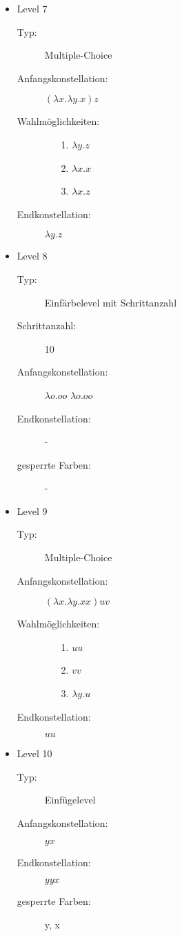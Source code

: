 \begin{itemize}
	\item{Level 7} 
		\begin{description}
			\item[Typ:] Multiple-Choice 
			\item[Anfangskonstellation:] \((\lambda x . \lambda y . x ) z\)    
			\item[Wahlmöglichkeiten:] \hfill
				\begin{itemize}
					\item[1.] \( \lambda y . z\) 
					\item[2.] \( \lambda x . x \) 
					\item[3.] \( \lambda x . z\)
				\end{itemize}
			\item[Endkonstellation:]\( \lambda y . z\)
		\end{description}

	\item{Level 8} 
		\begin{description}
			\item[Typ:] Einfärbelevel mit Schrittanzahl
			\item[Schrittanzahl:] 10
			\item[Anfangskonstellation:] \(\lambda o . o o \)  \(\lambda o . o o \) 
			\item[Endkonstellation:]  -
			\item[gesperrte Farben:] -
		\end{description}

	\item{Level 9} 
		\begin{description}
			\item[Typ:] Multiple-Choice 
			\item[Anfangskonstellation:] \((\lambda x . \lambda y . x x ) u v\)    
			\item[Wahlmöglichkeiten:] \hfill
				\begin{itemize}
					\item[1.] \( u u\) 
					\item[2.] \( v v \) 
					\item[3.] \( \lambda y . u\)
				\end{itemize}
			\item[Endkonstellation:]\(u u\)
		\end{description}
	
	\item{Level 10} 
		\begin{description}
			\item[Typ:] Einfügelevel
			\item[Anfangskonstellation:] \(y x \)    
			\item[Endkonstellation:] \(y y x\)
			\item[gesperrte Farben:] y, x 
		\end{description}


\end{itemize}
